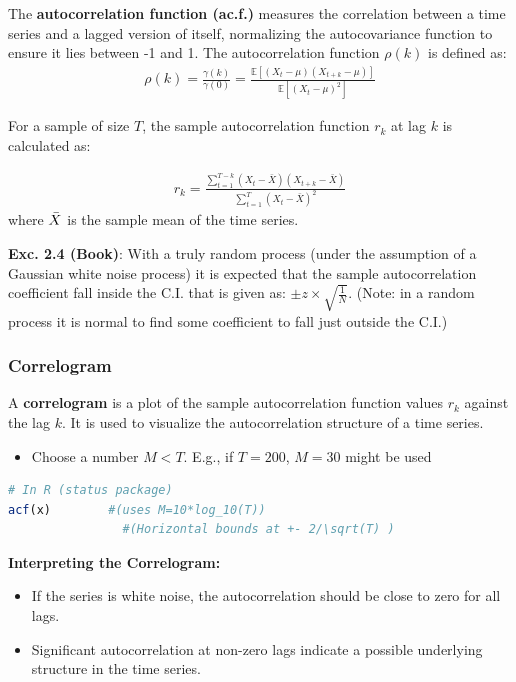 The \textbf{autocorrelation function (ac.f.)} measures the correlation between a time series and a lagged version of itself, normalizing the autocovariance function to ensure it lies between -1 and 1. The autocorrelation function $\rho(k)$ is defined as:
\begin{align}
    \rho(k)= \frac{\gamma(k)}{\gamma(0)}=\frac{\mathbb{E}[(X_t-\mu)(X_{t+k}-\mu)]}{\mathbb{E}[(X_t-\mu)^2]}
\end{align}

For a sample of size $T$, the sample autocorrelation function $r_k$ at lag $k$ is calculated as:

\begin{align}
    r_k=\frac{\sum_{t=1}^{T-k} (X_t-\bar{X})(X_{t+k}-\bar{X})}{\sum_{t=1}^{T} (X_t-\bar{X})^2}
\end{align}
where $\Bar{X}$ is the sample mean of the time series.


\textbf{Exc. 2.4 (Book)}: With a truly random process (under the assumption of a Gaussian white noise process) it is expected that the sample autocorrelation coefficient fall inside the C.I. that is given as: $\pm z\times \sqrt{\frac{1}{N}}$. (Note: in a random process it is normal to find some coefficient to fall just outside the C.I.)\\


\subsubsection{Correlogram}

A \textbf{correlogram} is a plot of the sample autocorrelation function values $r_k$ against the lag $k$. It is used to visualize the autocorrelation structure of a time series.

\begin{itemize}
    \item Choose a number $M<T$. E.g., if $T=200$, $M=30$ might be used
\end{itemize}

\begin{lstlisting}[language=R]
# In R (status package)
acf(x)        #(uses M=10*log_10(T))
                #(Horizontal bounds at +- 2/\sqrt(T) )
\end{lstlisting}

\textbf{Interpreting the Correlogram:}
\begin{itemize}
    \item If the series is white noise, the autocorrelation should be close to zero for all lags.
    \item Significant autocorrelation at non-zero lags indicate a possible underlying structure in the time series.
\end{itemize}

